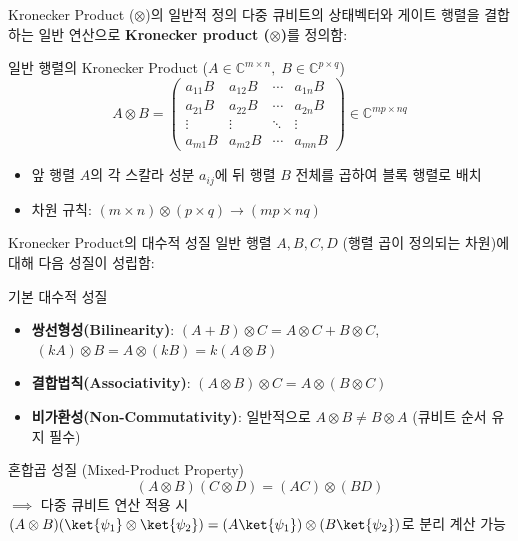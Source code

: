 \documentclass[aspectratio=169, 10pt]{beamer}
\begin{document}
\begin{frame}{Kronecker Product ($\otimes$)의 일반적 정의}
    다중 큐비트의 상태벡터와 게이트 행렬을 결합하는 일반 연산으로 \textbf{Kronecker product ($\otimes$)}를 정의함:
    \vspace{0.15cm}
    \begin{qcblock}{일반 행렬의 Kronecker Product ($A \in \mathbb{C}^{m \times n}, \; B \in \mathbb{C}^{p \times q}$)}
        $$A \otimes B = \begin{pmatrix}
        a_{11}B & a_{12}B & \cdots & a_{1n}B \\
        a_{21}B & a_{22}B & \cdots & a_{2n}B \\
        \vdots  & \vdots  & \ddots & \vdots  \\
        a_{m1}B & a_{m2}B & \cdots & a_{mn}B
        \end{pmatrix} \in \mathbb{C}^{mp \times nq}$$
        \begin{itemize}
            \item 앞 행렬 $A$의 각 스칼라 성분 $a_{ij}$에 뒤 행렬 $B$ 전체를 곱하여 블록 행렬로 배치
            \pause
            \item 차원 규칙: $(m \times n) \otimes (p \times q) \longrightarrow (mp \times nq)$
        \end{itemize}
    \end{qcblock}
\end{frame}

\begin{frame}{Kronecker Product의 대수적 성질}
    일반 행렬 $A, B, C, D$ (행렬 곱이 정의되는 차원)에 대해 다음 성질이 성립함:
    \vspace{0.15cm}
    \begin{qcblock}{기본 대수적 성질}
        \begin{itemize}
            \item \textbf{쌍선형성(Bilinearity)}: $(A + B) \otimes C = A \otimes C + B \otimes C$, $\; (kA) \otimes B = A \otimes (kB) = k(A \otimes B)$
            \pause
            \item \textbf{결합법칙(Associativity)}: $(A \otimes B) \otimes C = A \otimes (B \otimes C)$
            \pause
            \item \textbf{비가환성(Non-Commutativity)}: 일반적으로 $A \otimes B \neq B \otimes A$ (큐비트 순서 유지 필수)
        \end{itemize}
    \end{qcblock}
    \pause
    \vspace{0.15cm}
    \begin{qcalert}{혼합곱 성질 (Mixed-Product Property)}
        $$(A \otimes B)(C \otimes D) = (AC) \otimes (BD)$$
        $\implies$ 다중 큐비트 연산 적용 시 $(A \otimes B)(\ket{\psi_1} \otimes \ket{\psi_2}) = (A\ket{\psi_1}) \otimes (B\ket{\psi_2})$로 분리 계산 가능
    \end{qcalert}
\end{frame}
\end{document}
